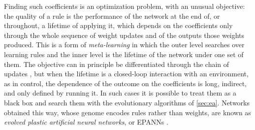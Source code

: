 Finding such coefficients is an optimization problem, with an unusual objective: the quality of a rule is the performance of the network at the end of, or throughout, a lifetime of applying it, which depends on the coefficients only through the whole sequence of weight updates and of the outputs those weights produced. This is a form of \emph{meta-learning} in which the outer level searches over learning rules and the inner level is the lifetime of the network under one set of them. The objective can in principle be differentiated through the chain of updates \cite{miconi2018differentiable}, but when the lifetime is a closed-loop interaction with an environment, as in control, the dependence of the outcome on the coefficients is long, indirect, and only defined by running it. In such cases it is possible to treat them as a black box and search them with the evolutionary algorithms of \autoref{sec:ea}. Networks obtained this way, whose genome encodes rules rather than weights, are known as \emph{evolved plastic artificial neural networks}, or EPANNs \cite{floreano2000evolutionary, soltoggio2018born}.
